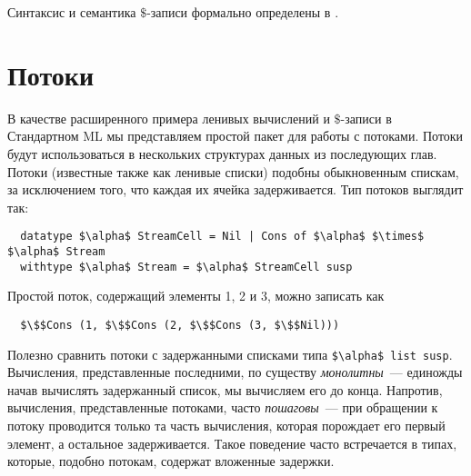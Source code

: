 Синтаксис и семантика $\$$-записи формально определены в
\cite{Okasaki1996a}.

\section{Потоки}
\label{sc:4.2}

В качестве расширенного примера ленивых вычислений и $\$$-записи в
Стандартном ML мы представляем простой пакет для работы с
потоками. Потоки будут использоваться в нескольких структурах данных
из последующих глав.
Потоки (известные также как ленивые списки) подобны обыкновенным
спискам, за исключением того, что каждая их ячейка задерживается. Тип
потоков выглядит так:
\begin{lstlisting}
  datatype $\alpha$ StreamCell = Nil | Cons of $\alpha$ $\times$ $\alpha$ Stream
  withtype $\alpha$ Stream = $\alpha$ StreamCell susp
\end{lstlisting}
Простой поток, содержащий элементы 1, 2 и 3, можно записать как
\begin{lstlisting}
  $\$$Cons (1, $\$$Cons (2, $\$$Cons (3, $\$$Nil)))
\end{lstlisting}

Полезно сравнить потоки с задержанными списками типа
\lstinline!$\alpha$ list susp!. Вычисления, представленные последними,
по существу {\em монолитны}~--- единожды начав вычислять задержанный
список, мы вычисляем его до конца. Напротив, вычисления,
представленные потоками, часто {\em пошаговы}~--- при обращении к
потоку проводится только та часть вычисления, которая порождает его
первый элемент, а остальное задерживается. Такое поведение часто
встречается в типах, которые, подобно потокам, содержат вложенные
задержки.


